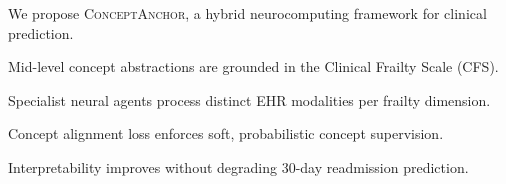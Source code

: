 \documentclass[review,12pt,authoryear]{elsarticle}
\newcommand{\modelname}{\textsc{ConceptAnchor}}
\begin{document}
\linenumbers   %

\begin{highlights}
\item We propose \modelname, a hybrid neurocomputing framework for clinical prediction.
\item Mid-level concept abstractions are grounded in the Clinical Frailty Scale (CFS).
\item Specialist neural agents process distinct EHR modalities per frailty dimension.
\item Concept alignment loss enforces soft, probabilistic concept supervision.
\item Interpretability improves without degrading 30-day readmission prediction.
\end{highlights}
\end{document}
